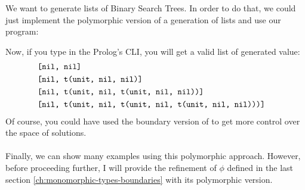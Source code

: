	
	We want to generate lists of Binary Search Trees. In order to do that, we could just implement the polymorphic version of a generation of lists and use our  program:
	
	Now, if you type  in the Prolog's CLI, you will get a valid list of  generated value:
	\begin{align*}
		  & \texttt{[nil, nil]}                                           &   \\
		  & \texttt{[nil, t(unit, nil, nil)]}                             &   \\
		  & \texttt{[nil, t(unit, nil, t(unit, nil, nil))]}               &   \\
		  & \texttt{[nil, t(unit, nil, t(unit, nil, t(unit, nil, nil)))]} &   \\
	\end{align*}
	Of course, you could have used the boundary version of  to get more control over the space of solutions.\\\\
	Finally, we can show many examples using this polymorphic approach. However, before proceeding further, I will provide the refinement of $\phi$ defined in the last section \ref{ch:monomorphic-types-boundaries} with its polymorphic version.
